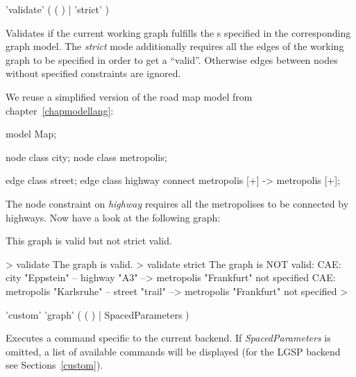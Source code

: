 \begin{rail}
  'validate' ( ( ) | 'strict' )
\end{rail}
Validates if the current working graph fulfills the s specified in the corresponding graph model. The \emph{strict} mode additionally requires all the edges of the working graph to be specified in order to get a ``valid''. Otherwise edges between nodes without specified constraints are ignored.\\
\begin{example}
We reuse a simplified version of the road map model from chapter~\ref{chapmodellang}:
\begin{grgen} 
model Map;

node class city;
node class metropolis;

edge class street;
edge class highway
      connect metropolis [+] -> metropolis [+];
\end{grgen}
The node constraint on \emph{highway} requires all the metropolises to be connected by highways. Now have a look at the following graph:
\begin{center}
\end{center}

This graph is valid but not strict valid.
\begin{grshell} 
> validate
The graph is valid.
> validate strict
The graph is NOT valid:
  CAE: city "Eppstein" -- highway "A3" --> metropolis "Frankfurt" not specified
  CAE: metropolis "Karlsruhe" -- street "trail" --> metropolis "Frankfurt" not specified
>
\end{grshell}
\end{example}

\begin{rail}
  'custom' 'graph' ( ( ) | SpacedParameters )
\end{rail}
Executes a command specific to the current backend. If \emph{SpacedParameters} is omitted, a list of available commands will be displayed (for the LGSP backend see Sections~\ref{custom}).

